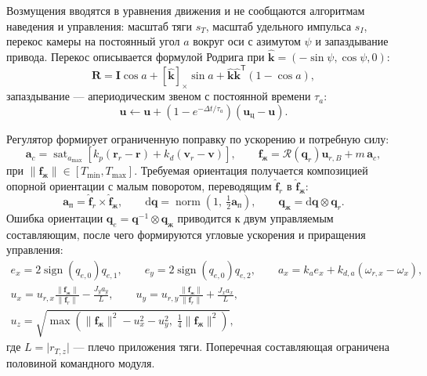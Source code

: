 \documentclass[11pt,a4paper]{article}
\newcommand{\vect}[1]{\bm{#1}}
\newcommand{\quat}[1]{\bm{#1}}
\newcommand{\Rot}{\mathcal{R}}
\newcommand{\dd}{\mathrm{d}}
\begin{document}
Возмущения вводятся в уравнения движения и не сообщаются алгоритмам наведения и
управления: масштаб тяги $s_T$, масштаб удельного импульса $s_I$, перекос камеры
на постоянный угол $a$ вокруг оси с азимутом $\psi$ и запаздывание привода.
Перекос описывается формулой Родрига при
$\hat{\vect{k}}=(-\sin\psi,\cos\psi,0)$:
\begin{equation}
\vect{R} = \vect{I}\cos a + \left[\hat{\vect{k}}\right]_\times \sin a
         + \hat{\vect{k}}\hat{\vect{k}}^{\mathsf{T}}(1-\cos a),
\end{equation}
запаздывание — апериодическим звеном с постоянной времени $\tau_a$:
\begin{equation}
\vect{u} \leftarrow \vect{u} + \left(1-e^{-\Delta t/\tau_a}\right)
  \left(\vect{u}_{\text{ц}}-\vect{u}\right).
\end{equation}

Регулятор формирует ограниченную поправку по ускорению и потребную силу:
\begin{equation}
\vect{a}_c = \operatorname{sat}_{a_{\max}}\!\left[
  k_{p}\left(\vect{r}_r-\vect{r}\right)
  + k_{d}\left(\vect{v}_r-\vect{v}\right)\right],
\qquad
\vect{f}_{\text{ж}} = \Rot\left(\quat{q}_r\right)\vect{u}_{r,B}
 + m\,\vect{a}_c ,
\end{equation}
при $\lVert\vect{f}_{\text{ж}}\rVert\in\left[T_{\min},T_{\max}\right]$. Требуемая
ориентация получается композицией опорной ориентации с малым поворотом,
переводящим $\hat{\vect{f}}_r$ в $\hat{\vect{f}}_{\text{ж}}$:
\begin{equation}
\vect{a}_{\text{п}}=\hat{\vect{f}}_r\times\hat{\vect{f}}_{\text{ж}},
\qquad
\dd\quat{q}=\operatorname{norm}
 \left(1,\ \tfrac{1}{2}\vect{a}_{\text{п}}\right),
\qquad
\quat{q}_{\text{ж}}=\dd\quat{q}\otimes\quat{q}_r .
\end{equation}
Ошибка ориентации
$\quat{q}_e=\quat{q}^{-1}\otimes\quat{q}_{\text{ж}}$ приводится к двум
управляемым составляющим, после чего формируются угловые ускорения и приращения
управления:
\begin{gather}
e_x = 2\operatorname{sign}\left(q_{e,0}\right)q_{e,1},
\qquad
e_y = 2\operatorname{sign}\left(q_{e,0}\right)q_{e,2},
\qquad
a_x = k_{a}e_x + k_{d,a}\left(\omega_{r,x}-\omega_x\right),\\[4pt]
u_x = u_{r,x}\frac{\lVert\vect{f}_{\text{ж}}\rVert}{\lVert\vect{f}_r\rVert}
 - \frac{J_y a_y}{L},
\qquad
u_y = u_{r,y}\frac{\lVert\vect{f}_{\text{ж}}\rVert}{\lVert\vect{f}_r\rVert}
 + \frac{J_x a_x}{L},\\[4pt]
u_z=\sqrt{\max\!\left(\lVert\vect{f}_{\text{ж}}\rVert^2-u_x^2-u_y^2,\;
  \tfrac{1}{4}\lVert\vect{f}_{\text{ж}}\rVert^2\right)},
\end{gather}
где $L=\lvert r_{T,z}\rvert$ — плечо приложения тяги. Поперечная составляющая
ограничена половиной командного модуля.
\end{document}
